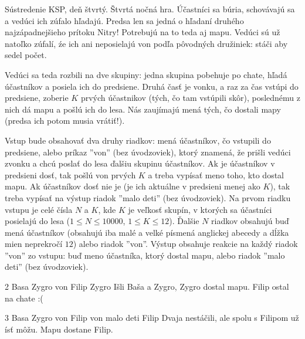 



Sústredenie KSP, deň štvrtý. Štvrtá nočná hra. Účastníci sa búria, schovávajú 
sa a vedúci ich zúfalo hľadajú. Predsa len sa jedná o hľadaní druhého 
najzápadnejšieho prítoku Nitry! Potrebujú na to teda aj mapu. Vedúci sú už 
natoľko zúfalí, źe ich ani neposielajú von podľa pôvodných družiniek: stáči 
aby sedel počet.

Vedúci sa teda rozbili na dve skupiny: jedna skupina pobehuje po chate, hľadá 
účastníkov a posiela ich do predsiene. Druhá časť je vonku, a raz za čas 
vstúpi do predsiene, zoberie $K$ prvých účastnikov (tých, čo tam vstúpili 
skôr), poslednému z nich dá mapu a pošlú ich do lesa. Nás zaujímajú mená tých, 
čo dostali mapy (predsa ich potom musia vrátiť!).

Vstup bude obsahovať dva druhy riadkov: mená účastníkov, čo vstupili do 
predsiene, alebo príkaz ''von'' (bez úvodzoviek), ktorý znamená, že prišli 
vedúci zvonku a chcú poslať do lesa ďalšiu skupinu účastníkov. Ak je 
účastníkov v predsieni dosť, tak pošlú von prvých $K$ a treba vypísať meno 
toho, kto dostal mapu. Ak účastníkov dosť nie je (je ich aktuálne v predsieni 
menej ako $K$), tak treba vypísať na výstup riadok ''malo deti'' (bez 
úvodzoviek).
Na prvom riadku vstupu je celé čísla $N$ a $K$, kde $K$ je veľkosť skupín, v 
ktorých sa účastníci posielajú do lesa ($1 \leq N \leq 10000$, $1 \leq K 
\leq 12$). Ďalšie $N$ riadkov obsahujú buď mená účastníkov (obsahujú iba malé 
a velké písmená anglickej abecedy a dĺžka mien neprekročí $12$) alebo riadok 
''von''.
Výstup obsahuje reakcie na každý riadok ''von'' zo vstupu: buď meno účastníka,
ktorý dostal mapu, alebo riadok ''malo deti'' (bez úvodzoviek).

 2
Basa
Zygro
von
Filip
\vystup
Zygro
\komentar
Išli Baša a Zygro, Zygro dostal mapu.
Filip ostal na chate :(
\koniec

 3
Basa
Zygro
von
Filip
von
\vystup
malo deti
Filip
\komentar
Dvaja nestáčili, ale spolu s Filipom už ísť môžu. Mapu dostane Filip.
\koniec


